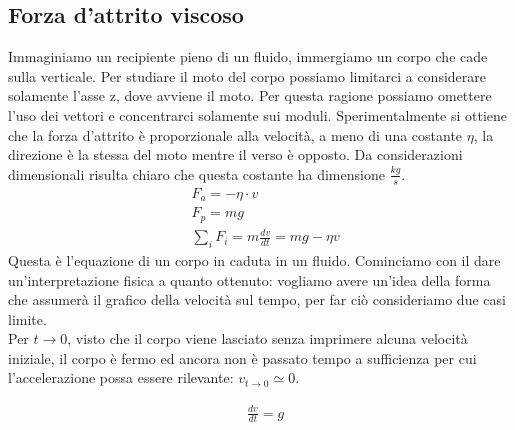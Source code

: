 \documentclass[10pt,a4paper]{article}
\begin{document}
\subsection{Forza d'attrito viscoso}
Immaginiamo un recipiente pieno di un fluido, immergiamo un corpo che cade sulla verticale. Per studiare il moto del corpo possiamo limitarci a considerare solamente l'asse z, dove avviene il moto. Per questa ragione possiamo omettere l'uso dei vettori e concentrarci solamente sui moduli. Sperimentalmente si ottiene che la forza d'attrito è proporzionale alla velocità, a meno di una costante $\eta$, la direzione è la stessa del moto mentre il verso è opposto. Da considerazioni dimensionali risulta chiaro che questa costante ha dimensione $\frac{kg}{s}$.
\begin{align*}
&F_a=-\eta\cdot v\\
&F_p=mg\\
&\sum_{i}F_i=m\frac{dv}{dt}=mg-\eta v
\end{align*}
Questa è l'equazione di un corpo in caduta in un fluido. Cominciamo con il dare un'interpretazione fisica a quanto ottenuto: vogliamo avere un'idea della forma che assumerà il grafico della velocità sul tempo, per far ciò consideriamo due casi limite.\\
Per $t\rightarrow 0$, visto che il corpo viene lasciato senza imprimere alcuna velocità iniziale, il corpo è fermo ed ancora non è passato tempo a sufficienza per cui l'accelerazione possa essere rilevante: $v_{t\rightarrow 0} \simeq 0$.

\begin{align*}
&\frac{dv}{dt}=g
\end{align*}
\end{document}
